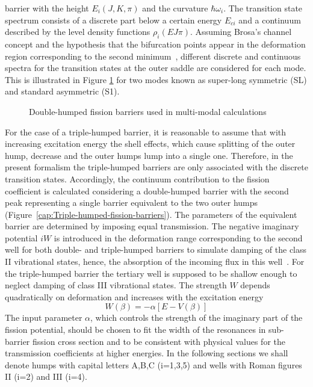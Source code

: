\documentclass[twocolumn,amsmath,amssymb,10pt,groupedaddress,a4paper]{revtex4}
\begin{document}
barrier with the height $E_{i}(J,K,\pi)$ and the curvature $\hbar\omega_{i}$.
The transition state spectrum consists of a discrete part below a
certain energy $E_{ci}$ and a continuum described by the level density
functions $\rho_{i}(EJ\pi)$.
Assuming Brosa's channel concept and the hypothesis that the bifurcation
points appear in the deformation region corresponding to the second
minimum~\cite{Brosa:90}, different discrete and continuous spectra
for the transition states at the outer saddle are considered for each
mode. This is illustrated in Figure \ref{cap:Double-humped-fission-barriers-multimodal}
for two modes known as super-long symmetric (SL) and standard asymmetric
(S1).
%
\begin{figure}[htbp]
\caption{\label{cap:Double-humped-fission-barriers-multimodal}Double-humped
fission barriers used in multi-modal calculations}
\end{figure}
For the case of a triple-humped barrier, it is reasonable to assume
that with increasing excitation energy the shell effects, which cause
splitting of the outer hump, decrease and the outer humps lump into
a single one. Therefore, in the present formalism the triple-humped
barriers are only associated with the discrete transition states.
Accordingly, the continuum contribution to the fission coefficient
is calculated considering a double-humped barrier with the second
peak representing a single barrier equivalent to the two outer humps
(Figure~\ref{cap:Triple-humped-fission-barriers}). The parameters of the equivalent barrier
are determined by imposing equal transmission.
The negative imaginary potential $iW$ is introduced in the deformation
range corresponding to the second well for both double- and triple-humped
barriers to simulate damping of the class II vibrational states, hence,
the absorption of the incoming flux in this well~\cite{Back:74,Bhandari:79,Bjornholm:80}.
For the triple-humped barrier the tertiary well is supposed to be
shallow enough to neglect damping of class III vibrational states.
The strength $W$ depends quadratically on deformation and increases
with the excitation energy
\begin{equation}
W(\beta)=-\alpha[E-V(\beta)]
\end{equation}
 The input parameter $\alpha$, which controls the strength of the
imaginary part of the fission potential, should be chosen to fit the
width of the resonances in sub-barrier fission cross section and to
be consistent with physical values for the transmission coefficients
at higher energies.
In the following sections we shall denote humps with capital letters
A,B,C (i=1,3,5) and wells with Roman figures II (i=2) and III (i=4).
\end{document}
